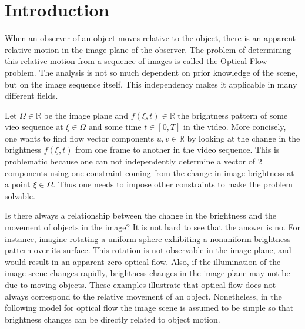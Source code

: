 \chapter{Introduction}
When an observer of an object moves relative to the object, there is an apparent relative motion in the image plane of the observer. The problem of determining this relative motion from a sequence of images is called the Optical Flow problem. The analysis is not so much dependent on prior knowledge of the scene, but on the image sequence itself. This independency makes it applicable in many different fields. 

Let $\Omega \in \mathbb{R}$ be the image plane and $f(\xi,t) \in \mathbb{R}$ the brightness pattern of some vieo sequence at $\xi \in \Omega$ and some time $t \in [0,T]$ in the video. More concisely, one wants to find flow vector components $u,v \in \mathbb{R}$ by looking at the change in the brightness $f(\xi,t)$ from one frame to another in the video sequence. This is problematic because one can not independently determine a vector of 2 components using one constraint coming from the change in image brightness at a point $\xi \in \Omega$. Thus one needs to impose other constraints to make the problem solvable.

Is there always a relationship between the change in the brightness and the movement of objects in the image? It is not hard to see that the answer is no. For instance, imagine rotating a uniform sphere exhibiting a nonuniform brightness pattern over its surface. This rotation is not observable in the image plane, and would result in an apparent zero optical flow. Also, if the illumination of the image scene changes rapidly, brightness changes in the image plane may not be due to moving objects. These examples illustrate that optical flow does not always correspond to the relative movement of an object. Nonetheless, in the following model for optical flow the image scene is assumed to be simple so that brightness changes can be directly related to object motion.